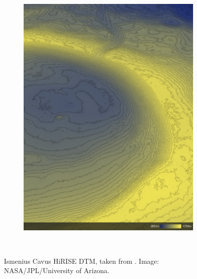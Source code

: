 \begin{figure}[h]
\begin{subfigure}[t]{\subfigureWidth}
        \label{fig:sub:ismenius-cavus-dtm}
    \end{subfigure}\hfill
    \begin{subfigure}[t]{\subfigureWidth}
        \centering
        \includegraphics[height=\graphicsHeight]{sections/mission-sites/images/ismenius-cavus-dtm-altimetry.png}
		\label{fig:sub:ismenius-cavus-dtm-altimetry}
	\end{subfigure}\\[0.8ex]
    \caption[Ismenius Cavus \ac{HiRISE} \ac{DTM}]
            {Ismenius Cavus \ac{HiRISE} \ac{DTM}, taken from . Image: \ac{NASA}/\ac{JPL}/University of Arizona.}
    \label{fig:ismenius-cavus}
\vspace{-2ex}
\end{figure}

\clearpage
